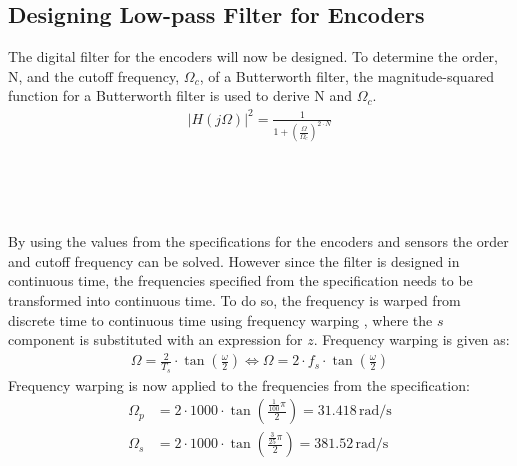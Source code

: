 \subsection{Designing Low-pass Filter for Encoders}
The digital filter for the encoders will now be designed. To determine the order, N, and the cutoff frequency, $\Omega_c$, of a Butterworth filter, the magnitude-squared function for a Butterworth filter is used\citep[p. 525]{oppenheim} to derive N and $\Omega_c$. 
\begin{align}
|H(j\Omega)|^2 = \frac{1}{1+(\frac{\Omega}{\Omega_c})^{2 \cdot N}}
\label{mag_sq}
\end{align}
\begin{where}
\\
\\
\\
\end{where}

By using the values from the specifications for the encoders and sensors the order and cutoff frequency can be solved. However since the filter is designed in continuous time, the frequencies specified from the specification needs to be transformed into continuous time. To do so, the frequency is warped from discrete time to continuous time using frequency warping \citep[p. 529]{oppenheim}, where the $s$ component is substituted with an expression for $z$. Frequency warping is given as:
\begin{align}
\Omega = \frac{2}{T_s} \cdot \tan(\frac{\omega}{2}) \Leftrightarrow \Omega = 2\cdot f_s \cdot \tan(\frac{\omega}{2})
\label{prewarp}
\end{align}
Frequency warping is now applied to the frequencies from the specification:
\begin{align}
\Omega_p &= 2 \cdot 1000 \cdot \tan(\frac{\frac{1}{100} \pi}{2}) = 31.418 \, \text{rad/s}\\
\Omega_s &= 2 \cdot 1000 \cdot \tan(\frac{\frac{3}{25} \pi}{2}) = 381.52 \, \text{rad/s}
\label{prewarp_calc}
\end{align}
\begin{where}
\\
\\
\end{where}

